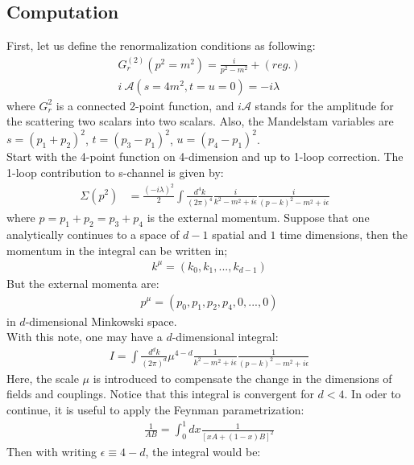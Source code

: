 \documentclass[fleqn]{article}
\begin{document}
\subsection{Computation}
First, let us define the renormalization conditions as following:
\begin{align}
&\textit{G}_r ^{(2)}( p^{2} = m^{2}) = \frac{i}{p^{2} -m^{2}} + (reg.)&\\
&i\ \mathcal{A}(s=4m^{2}, t= u =0) = -i\lambda&
\end{align}
where $G_r ^{2}$ is a connected 2-point function, and $i\mathcal{A}$ stands for the amplitude for the scattering two scalars into two scalars. Also, the Mandelstam variables are $s = (p_1 + p_2)^{2}$, $t= (p_3 -p_1)^{2}$, $u =(p_4 - p_1)^{2}$.\\
Start with the 4-point function on 4-dimension and up to 1-loop correction. The 1-loop contribution to s-channel is given by:
\begin{align}
\Sigma (p^{2}) &= \frac{(-i\lambda)^{2}}{2}\int\frac{d^{4}k}{(2\pi)^{4}}\frac{i}{k^{2}-m^{2}+i\epsilon}\frac{i}{(p-k)^{2}-m^{2} + i\epsilon}&
\end{align}
where $p = p_1 + p_2 = p_3 + p_4$ is the external momentum. Suppose that one analytically continues to a space of $d-1$ spatial and $1$ time dimensions, then the momentum in the integral can be written in;
\begin{align}
k^{\mu} = (k_0, k_1,...,k_{d-1})
\end{align}
But the external momenta are:
\begin{align}
p^{\mu} = (p_0,p_1,p_2,p_4,0,...,0)
\end{align}
in $d$-dimensional Minkowski space.\\
With this note, one may have a $d$-dimensional integral:
\begin{align}
I = \int \frac{d^{d}k}{(2\pi)^d}\mu^{4-d} \frac{1}{k^{2}-m^{2}+i\epsilon} \frac{1}{(p-k)^{2}-m^{2} + i\epsilon}
\end{align}
Here, the scale $\mu$ is introduced to  compensate the change in the dimensions of fields and couplings. Notice that this integral is convergent for $d<4$. In oder to continue, it is useful to apply the Feynman parametrization:
\begin{align}
\frac{1}{AB} = \int_{0}^{1}dx \frac{1}{[xA+(1-x)B]^{2}}
\end{align}
Then with writing $\epsilon \equiv 4-d$, the integral would be:
\end{document}
